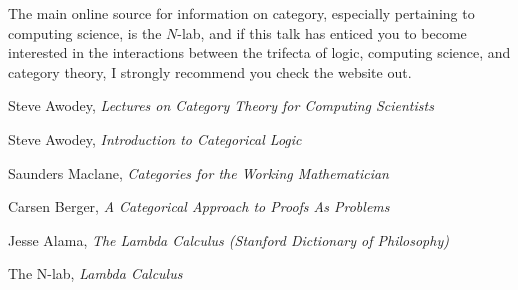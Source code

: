 \documentclass{article}
\theoremstyle{plain}
\begin{document}
The main online source for information on category, especially pertaining to computing science, is the $N$-lab, and if this talk has enticed you to become interested in the interactions between the trifecta of logic, computing science, and category theory, I strongly recommend you check the website out.

\begin{thebibliography}{10}
     Steve Awodey,
    \emph{Lectures on Category Theory for Computing Scientists}

     Steve Awodey,
    \emph{Introduction to Categorical Logic}

     Saunders Maclane,
    \emph{Categories for the Working Mathematician}

     Carsen Berger,
    \emph{A Categorical Approach to Proofs As Problems}

     Jesse Alama,
    \emph{The Lambda Calculus (Stanford Dictionary of Philosophy)}

     The N-lab,
    \emph{Lambda Calculus}
\end{thebibliography}
\end{document}
